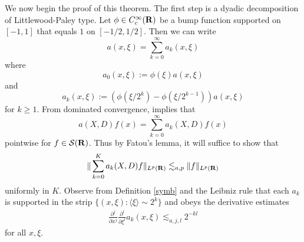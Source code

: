 \documentclass[11pt]{article}
\theoremstyle{definition}
\theoremstyle{remark}
\begin{document}
We now begin the proof of this theorem. The first step is a dyadic decomposition of Littlewood-Paley type. Let \({\phi \in C^\infty_c({\bf R})}\) be a bump function supported on \({[-1,1]}\) that equals \({1}\) on \({[-1/2,1/2]}\). Then we can write 
\[\displaystyle  a(x,\xi) = \sum_{k=0}^\infty a_k(x,\xi)\]
 where 
\[\displaystyle  a_0(x,\xi) := \phi(\xi) a(x,\xi) \]
 and 
\[\displaystyle  a_k(x,\xi) := (\phi(\xi/2^k) - \phi(\xi/2^{k-1})) a(x,\xi)\]
 for \({k \geq 1}\). From dominated convergence, implies that 
\[\displaystyle  a(X,D) f(x) = \sum_{k=0}^\infty a_k(X,D) f(x)\]
 pointwise for \({f \in {\mathcal S}({\bf R})}\). Thus by Fatou’s lemma, it will suffice to show that 
\[\displaystyle  \| \sum_{k=0}^K a_k(X,D) f \|_{L^p({\bf R})} \lesssim_{a,p} \|f\|_{L^p({\bf R})}\]
 uniformly in \({K}\). Observe from Definition \ref{symb} and the Leibniz rule that each \({a_k}\) is supported in the strip \({\{ (x,\xi): \langle \xi \rangle \sim 2^k \}}\) and obeys the derivative estimates 
\begin{align}\label{akderiv}
  \frac{\partial^j}{\partial x^j} \frac{\partial^l}{\partial \xi^l} a_k(x,\xi) \lesssim_{a,j,l} 2^{-kl} 
\end{align}
 for all \({x,\xi}\).
\end{document}
